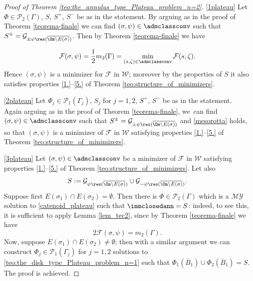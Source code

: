 \skpt
\begin{proof}[Proof of Theorem \ref{teo:the_annulus_type_Plateau_problem_n=2}]

\ref{1plateau} Let $\Phi\in\mathcal{P}_2(\Gamma)$, $S$, $S^+$, $S^-$ be as in the statement.
By arguing as in the proof of Theorem \ref{teorema-finale} we can find $(\sigma,\psi)\in\admclassconv$ such that $S^\pm=\mathcal{G}_{\pm\psi\res (\overline{\Om\setminus E(\sigma)})}$.
Then by Theorem \ref{teorema-finale} we have

\begin{equation}\label{mesorotta}
\mathcal{F}(\sigma,\psi)=\frac12 m_2(\Gamma)= \min_{(s,\zeta)\in\admclassconv}\mathcal{F}(s,\zeta).
\end{equation}
Hence $(\sigma,\psi)$ is a minimizer for $\mathcal F$ in $\mathcal W$; moreover by the properties of $S$ it also satisfies properties \ref{1.}--\ref{5.} of Theorem \ref{teo:structure_of_minimizers}.

\ref{2plateau}
Let $\Phi_j\in \mathcal{P}_1(\Gamma_j)$, $S_j$ for $j=1,2$, $S^+$, $S^-$ be as in the statement.
Again arguing as in the proof of Theorem \ref{teorema-finale}, we~can find $(\sigma,\psi)\in\admclassconv$ such that $S^\pm=\mathcal{G}_{\pm\psi\res(\overline{\Om\setminus E(\sigma)})}$ and \eqref{mesorotta} holds, so that $(\sigma,\psi)$ is a minimizer of $\mathcal F$ in $\mathcal W$ satisfying properties \ref{1.}--\ref{5.} of Theorem \ref{teo:structure_of_minimizers}.

\ref{3plateau} Let $(\sigma,\psi)\in\admclassconv$ be a minimizer of $\mathcal F$ in $\mathcal W$ satisfying properties \ref{1.}--\ref{5.} of Theorem \ref{teo:structure_of_minimizers}. Let also
\[
S:=\mathcal G_{\psi\res (\overline{\Om\setminus E(\sigma)})}\cup\mathcal G_{-\psi\res (\overline{\Om\setminus E(\sigma)})}.
\]
Suppose first $E(\sigma_1)\cap E(\sigma_2)=\emptyset$. Then
there is $\Phi\in \mathcal{P}_2(\Gamma)$ which is a $\mathcal{MY}$ solution to \eqref{catenoid_plateau} such that $\immclosedann=S$:
indeed, to see this, it is sufficient to apply Lemma \ref{lem_tec2}, since by Theorem \ref{teorema-finale} we have
\begin{equation}\label{cd0}
2\mathcal F(\sigma, \psi)= m_2(\Gamma).
\end{equation}
Now, suppose
$E(\sigma_1)\cap E(\sigma_2)\ne\emptyset$; then with a similar argument we can construct $\Phi_j\in\mathcal P_1(\Gamma_j)$ for $j=1,2$ solutions to \eqref{teo:the_disk_type_Plateau_problem_n=1} such that $\Phi_1(\overline B_1)\cup \Phi_2(\overline B_1)=S$.
The proof is achieved.
\end{proof}

